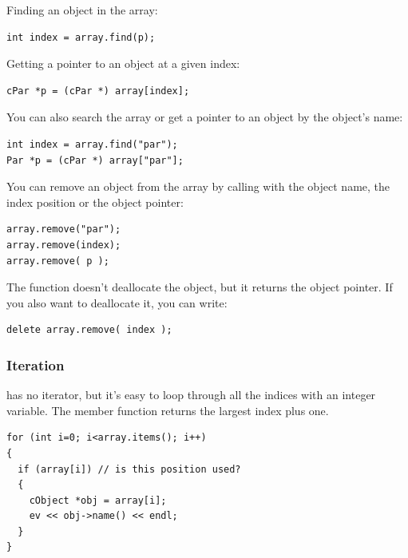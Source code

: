 Finding an object in the array:

\begin{verbatim}
int index = array.find(p);
\end{verbatim}

Getting a pointer to an object at a given index:

\begin{verbatim}
cPar *p = (cPar *) array[index];
\end{verbatim}

You can also search the array or get a pointer to an object by
the object's name:

\begin{verbatim}
int index = array.find("par");
Par *p = (cPar *) array["par"];
\end{verbatim}


You can remove an object from the array by calling 
with the object name, the index position or the object pointer:

\begin{verbatim}
array.remove("par");
array.remove(index);
array.remove( p );
\end{verbatim}


The  function doesn't deallocate the object, but it
returns the object pointer. If you also want to deallocate it, you can
write:

\begin{verbatim}
delete array.remove( index );
\end{verbatim}

\subsubsection{Iteration}


 has no iterator, but it's easy to loop through all the
indices with an integer variable. The  member function
returns the largest index plus one.

\begin{verbatim}
for (int i=0; i<array.items(); i++)
{
  if (array[i]) // is this position used?
  {
    cObject *obj = array[i];
    ev << obj->name() << endl;
  }
}
\end{verbatim}


%
%
%
%




